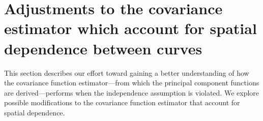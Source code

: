 

\newpage

\section{Adjustments to the covariance estimator which account for spatial dependence between curves} 

\label{sec:investigating_the_effects_of_spatial_dependence}

This section describes our effort toward gaining a better understanding of how the covariance function estimator---from which the principal component functions are derived---performs when the independence assumption is violated. We explore possible modifications to the covariance function estimator that account for spatial dependence. 

